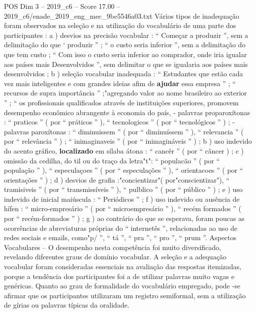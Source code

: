 \begin{textsample}{POS Dim 3 – 2019\_c6 – Score 17.00 – 2019\_c6/enade\_2019\_eng\_mec\_9be5546a03.txt}
Vários tipos de inadequação foram observados na seleção e na utilização do vocabulário de uma parte dos participantes : a ) desvios na precisão vocabular : “ Começar a produzir ”, sem a delimitação do que ‘ produzir ” ; “ o custo seria inferior ”, sem a delimitação do que tem custo ; “ Com isso o custo seria inferior ao comprador, onde iria igualar aos países mais Desenvolvidos ”, sem delimitar o que se igualaria aos países mais desenvolvidos ; b ) seleção vocabular inadequada : “ Estudantes que estão cada vez mais inteligentes e com grandes ideias afim de \textbf{ajudar} essa empresa ” ; “ recursos de supra importância ” ;"agregando valor ao nome brasileiro ao exterior ” ; “ os profissionais qualificados através de instituições superiores, promovem desempenho econômico abrangente à economia do país, - palavras proparoxítonas : “ praticos ” ( por “ práticos ” ), “ tecnologicos ” ( por “ tecnológicos ” ) ; - palavras paroxítonas : “ diminuissem ” ( por “ diminuíssem ” ), “ relevancia ” ( por “ relevância ” ) ; “ inimaginaveis ” ( por “ inimagináveis ” ) ; b ) uso indevido do acento gráfico, \textbf{localizado} em sílaba átona : “ cancêr ” ( por “ câncer ) ; c ) omissão da cedilha, do til ou do traço da letra"t": “ populacão ” ( por “ população ” ), “ especulaçoes ” ( por “ especulações ” ), “ orientacoes ” ( por “ orientações ” ) ; d ) desvios de grafia :"concientizar"( por"conscientizar"), “ tramisiveis ” ( por “ transmissíveis ” ), “ pulblico ” ( por “ público ” ) ; e ) uso indevido de inicial maiúscula : “ Periódicos ” ; f ) uso indevido ou ausência de hífen : “ micro-empresário ” ( por “ microempresário ” ), “ recém formados ” ( por “ recém-formados ” ) ; g ) ao contrário do que se esperava, foram poucas as ocorrências de abreviaturas próprias do “ internetês ”, relacionadas ao uso de redes sociais e emails, como"p/ ”, “ tá ”, “ pra ”, “ pro ”, “ prum ”.
Aspectos Vocabulares – O desempenho nesta competência foi muito diversificado, revelando diferentes graus de domínio vocabular.
A seleção e a adequação vocabular foram consideradas essenciais na avaliação das respostas itemizadas, porque a tendência dos participantes foi a de utilizar palavras muito vagas e genéricas.
Quanto ao grau de formalidade do vocabulário empregado, pode -se afirmar que os participantes utilizaram um registro semiformal, sem a utilização de gírias ou palavras típicas da oralidade.

\end{textsample}
